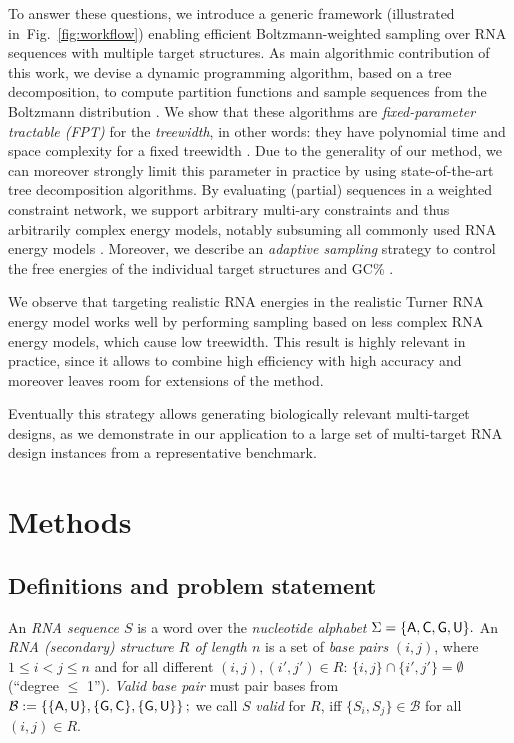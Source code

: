 \documentclass{bmcart}
\newcommand{\B}{\mathcal{B}}
\newcommand{\Def}[1]{\emph{#1}}
\newcommand{\Nuc}[1]{{\sf #1}}
\newcommand{\Ab}{\Nuc{A}}
\newcommand{\Cb}{\Nuc{C}}
\newcommand{\Gb}{\Nuc{G}}
\newcommand{\Ub}{\Nuc{U}}
\newcommand{\GCb}{\Gb\Cb}
\begin{document}
To answer these questions, we introduce a generic framework (illustrated in~Fig.~\ref{fig:workflow}) enabling efficient Boltzmann-weighted sampling over RNA sequences with multiple target structures. As main algorithmic contribution of this work, we devise a dynamic programming algorithm, based on a tree decomposition, to compute partition functions and sample sequences from the Boltzmann distribution%
. We show that these algorithms are \Def{fixed-parameter tractable (FPT)} for the \Def{treewidth},
in other words: they have polynomial time and space complexity for a fixed treewidth%
%
. Due to the generality of our method, we can moreover strongly limit this parameter in practice by using state-of-the-art tree decomposition algorithms.
By evaluating (partial) sequences in a weighted constraint
network, we support arbitrary multi-ary constraints and thus
arbitrarily complex energy models,
notably subsuming all commonly
used RNA energy models%
.  Moreover, we describe an \Def{adaptive
  sampling} strategy to control the free energies of the individual
target structures and \GCb\%%
. %

We observe that
targeting realistic RNA energies in the realistic
Turner RNA energy model
works well by performing sampling based on less complex RNA energy models, which cause low treewidth. This result is highly relevant in practice, since it allows to combine high efficiency with high accuracy and moreover leaves room for extensions of the method.

Eventually this strategy allows generating biologically relevant
multi-target designs, as we demonstrate in our application 
to a large set of multi-target RNA design instances from a
representative benchmark.

\section*{Methods}
\subsection*{Definitions and problem statement}
\label{sec:problem-statement}

An \Def{RNA sequence $S$} is a word over the \Def{nucleotide
  alphabet} $\Sigma=\{\Ab,\Cb,\Gb,\Ub\}.$
An \Def{RNA (secondary) structure $R$ of
  length $n$} is a set of \Def{base pairs} $(i,j)$, where
$1\leq i<j\leq n$ and for all different $(i,j), (i',j')\in R$:
$\{i,j\}\cap\{i',j'\}=\emptyset$ (``degree $\leq$ 1'').
%
%
\Def{Valid base pair} must pair bases from
$\B:=\left\{\{\Ab,\Ub\},\{\Gb,\Cb\},\{\Gb,\Ub\}\right\};$
we call $S$ \Def{valid} for $R$, iff $\{S_i,S_j\}\in \B$ for
all $(i,j)\in R$.
 
\end{document}
